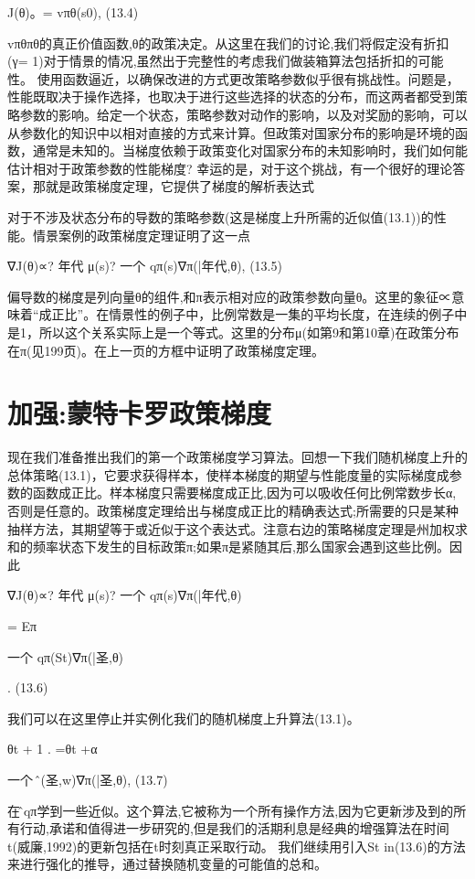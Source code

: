 J(θ)。= vπθ(s0), 					(13.4)

vπθπθ的真正价值函数,θ的政策决定。从这里在我们的讨论,我们将假定没有折扣(γ= 1)对于情景的情况,虽然出于完整性的考虑我们做装箱算法包括折扣的可能性。
使用函数逼近，以确保改进的方式更改策略参数似乎很有挑战性。问题是，性能既取决于操作选择，也取决于进行这些选择的状态的分布，而这两者都受到策略参数的影响。给定一个状态，策略参数对动作的影响，以及对奖励的影响，可以从参数化的知识中以相对直接的方式来计算。但政策对国家分布的影响是环境的函数，通常是未知的。当梯度依赖于政策变化对国家分布的未知影响时，我们如何能估计相对于政策参数的性能梯度?
幸运的是，对于这个挑战，有一个很好的理论答案，那就是政策梯度定理，它提供了梯度的解析表达式

对于不涉及状态分布的导数的策略参数(这是梯度上升所需的近似值(13.1))的性能。情景案例的政策梯度定理证明了这一点

∇J(θ)∝?
年代
μ(s)?
一个
qπ(s)∇π(|年代,θ), 					(13.5)

偏导数的梯度是列向量θ的组件,和π表示相对应的政策参数向量θ。这里的象征∝意味着“成正比”。在情景性的例子中，比例常数是一集的平均长度，在连续的例子中是1，所以这个关系实际上是一个等式。这里的分布μ(如第9和第10章)在政策分布在π(见199页)。在上一页的方框中证明了政策梯度定理。


\section{加强:蒙特卡罗政策梯度}

现在我们准备推出我们的第一个政策梯度学习算法。回想一下我们随机梯度上升的总体策略(13.1)，它要求获得样本，使样本梯度的期望与性能度量的实际梯度成参数的函数成正比。样本梯度只需要梯度成正比,因为可以吸收任何比例常数步长α,否则是任意的。政策梯度定理给出与梯度成正比的精确表达式;所需要的只是某种抽样方法，其期望等于或近似于这个表达式。注意右边的策略梯度定理是州加权求和的频率状态下发生的目标政策π;如果π是紧随其后,那么国家会遇到这些比例。因此

∇J(θ)∝?
年代
μ(s)?
一个
qπ(s)∇π(|年代,θ)


= Eπ

一个
qπ(St)∇π(|圣,θ)

. 					(13.6)


我们可以在这里停止并实例化我们的随机梯度上升算法(13.1)。

θt + 1
.
=θt +α

一个
问̂(圣,w)∇π(|圣,θ), 					(13.7)


在问̂qπ学到一些近似。这个算法,它被称为一个所有操作方法,因为它更新涉及到的所有行动,承诺和值得进一步研究的,但是我们的活期利息是经典的增强算法在时间t(威廉,1992)的更新包括在t时刻真正采取行动。
我们继续用引入St in(13.6)的方法来进行强化的推导，通过替换随机变量的可能值的总和。

